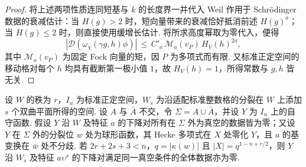 \begin{proof}
将上述两项性质连同短基与 $k$ 的长度界一并代入 Weil 作用于 Schrödinger 数据的衰减估计：当 $H(g)>2$ 时，短向量带来的衰减恰好抵消前述 $H(g)^a$；当 $H(g)\le2$ 时，则直接使用缓增长估计. 将所求高度幂取为零代入，便得
\[
 |\mathcal D(\omega_\chi(\gamma g,h)\phi)|
      \,\le\, C'_a\,\mathcal M_a(v_P)\,H_V(h)^{2a},
\]
其中 $\mathcal M_a(v_P)$ 为固定 Fock 向量的矩，因 $P$ 为多项式而有限. 又标准正定空间的移动格对每个 $h$ 均具有截断第一极小值 $1$，故 $H_V(h)=1$，所得常数与 $g,h$ 皆无关.
\end{proof}

\begin{lemma}
\label{lem:c-false-tower-step}
\emitthmsource
设 $W$ 的秩为 $r$，$I_n$ 为标准正定空间，$W_s$ 为沿适配标准整数格的分裂在 $W$ 上添加 $s$ 个双曲平面所得的空间. 设 $A$ 与 $\bar A$ 不交，令 $\Sigma=A\cup\bar A$，并设 $Y$ 为 $I_n$ 上的自守函数. 假设 $Y$ 沿 $W$ 及特征 $a$ 的下降对所有在 $\Sigma$ 外为真空的数据皆为零；又设 $Y$ 在 $\Sigma$ 外的分裂位 $w$ 处为球形函数，其 Hecke 多项式在 $X$ 处零化 $Y$，且 $a$ 的基变换在 $\bar w$ 处不分歧. 若 $2r+2s+3<n$，$q=|\kappa(w)|$ 且 $|X|=q^{1-n+r/2}$，则 $Y$ 沿 $W_s$ 及特征 $a\upsilon^s$ 的下降对满足同一真空条件的全体数据亦为零.
\end{lemma}

